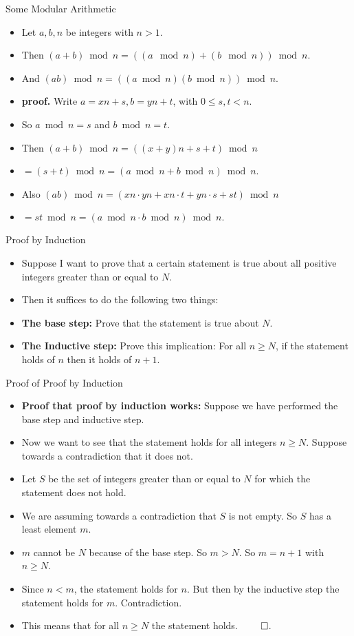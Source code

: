 \documentclass{beamer}
\begin{document}
\begin{frame}{Some Modular Arithmetic}
\begin{itemize}
  \item Let $a,b,n$ be integers with $n>1$.
  \item Then $(a+b) \bmod n = \left((a\mod n) + (b\mod n)\right) \bmod n$.
  \item And $(ab) \bmod n = \left ( (a\bmod n)(b \bmod n) \right) \bmod n$.
  \item \textbf{proof.} Write $a=xn+s, b=yn+t$, with $0\leq s,t < n$.
  \item So $a\bmod n = s$ and $b\bmod n = t$.
  \item Then $(a+b) \bmod n = \left((x +y)n  + s+t\right) \bmod n$
  \item $= (s+t)\bmod n = (a\bmod n + b \bmod n) \bmod n$.
  \item Also $(ab)\bmod n = (xn\cdot yn + xn\cdot t + yn\cdot s + st) \bmod n$
  \item $=st \bmod n = (a\bmod n \cdot b \bmod n) \bmod n.$
\end{itemize}
\end{frame}

\begin{frame}{Proof by Induction}
\begin{itemize}
  \item Suppose I want to prove that a certain statement is true about all positive integers greater than  or equal to $N$.
  \item Then it suffices to do the following two things:
  \item \textbf{The base step:} Prove that the statement is true about $N$.
  \item \textbf{The Inductive step:} Prove this implication: For all $n\geq N$, if the statement holds of $n$ then it holds of $n+1$.
\end{itemize}
\end{frame}

\begin{frame}{Proof of  Proof by Induction}
\begin{itemize}
  \item \textbf{Proof that proof by induction works:} Suppose we have performed the base step and inductive step.
  \item Now we want to see that the statement holds for all integers $n\geq N$. Suppose towards a contradiction that it does not.
  \item Let $S$ be the set of integers greater than or equal to $N$ for which the statement does not hold.
  \item We are assuming towards a contradiction that $S$ is not empty. So $S$ has a least element $m$.
  \item $m$ cannot be $N$ because of the base step. So $m>N$. So $m=n+1$ with $n\geq N$.
  \item Since $n<m$, the statement holds for $n$. But then by the inductive step the statement holds for $m$. Contradiction.
  \item This means that for all $n\geq N$ the statement holds. $\qed$.
\end{itemize}
\end{frame}
\end{document}
